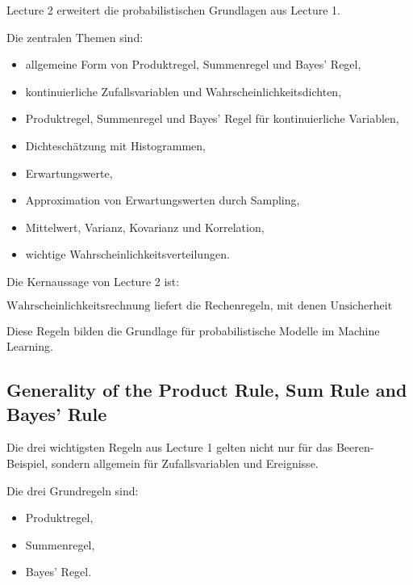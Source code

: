 \documentclass[11pt,a4paper]{scrartcl}
\begin{document}
\begin{notebox}
    Lecture 2 erweitert die probabilistischen Grundlagen aus Lecture 1.

    Die zentralen Themen sind:

    \begin{itemize}
        \item allgemeine Form von Produktregel, Summenregel und Bayes' Regel,
        \item kontinuierliche Zufallsvariablen und Wahrscheinlichkeitsdichten,
        \item Produktregel, Summenregel und Bayes' Regel für kontinuierliche Variablen,
        \item Dichteschätzung mit Histogrammen,
        \item Erwartungswerte,
        \item Approximation von Erwartungswerten durch Sampling,
        \item Mittelwert, Varianz, Kovarianz und Korrelation,
        \item wichtige Wahrscheinlichkeitsverteilungen.
    \end{itemize}
\end{notebox}

\begin{answerbox}
    Die Kernaussage von Lecture 2 ist:

    \[
        \boxed{
            \text{Wahrscheinlichkeitsrechnung liefert die Rechenregeln,
            mit denen Unsicherheit mathematisch verarbeitet wird.}
        }
    \]

    Diese Regeln bilden die Grundlage für probabilistische Modelle im Machine
    Learning.
\end{answerbox}

\subsection{Generality of the Product Rule, Sum Rule and Bayes' Rule}

\begin{notebox}
    Die drei wichtigsten Regeln aus Lecture 1 gelten nicht nur für das
    Beeren-Beispiel, sondern allgemein für Zufallsvariablen und Ereignisse.

    Die drei Grundregeln sind:

    \begin{itemize}
        \item Produktregel,
        \item Summenregel,
        \item Bayes' Regel.
    \end{itemize}
\end{notebox}
\end{document}
